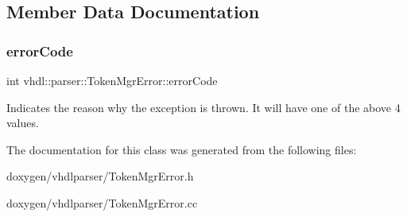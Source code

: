 \subsection{Member Data Documentation}
\mbox{\label{classvhdl_1_1parser_1_1_token_mgr_error_ac142542be128305d21d59277db52eb93}} 
\subsubsection{\texorpdfstring{errorCode}{errorCode}}
{\footnotesize\ttfamily int vhdl\+::parser\+::\+Token\+Mgr\+Error\+::error\+Code}

Indicates the reason why the exception is thrown. It will have one of the above 4 values. 

The documentation for this class was generated from the following files\+:\begin{DoxyCompactItemize}
\item 
doxygen/vhdlparser/Token\+Mgr\+Error.\+h\item 
doxygen/vhdlparser/Token\+Mgr\+Error.\+cc\end{DoxyCompactItemize}
